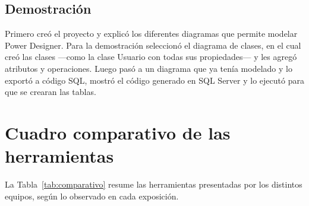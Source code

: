 \documentclass[journal,onecolumn]{IEEEtran}
\begin{document}
	\subsection{Demostración}
	
	Primero creó el proyecto y explicó los diferentes diagramas que permite modelar Power Designer. Para la demostración seleccionó el diagrama de clases, en el cual creó las clases —como la clase Usuario con todas sus propiedades— y les agregó atributos y operaciones. Luego pasó a un diagrama que ya tenía modelado y lo exportó a código SQL, mostró el código generado en SQL Server y lo ejecutó para que se crearan las tablas.
	
	\section{Cuadro comparativo de las herramientas}
	
	La Tabla~\ref{tab:comparativo} resume las herramientas presentadas por los distintos equipos, según lo observado en cada exposición.
	
\end{document}
